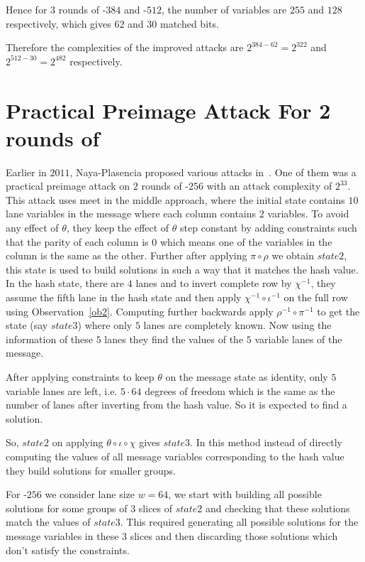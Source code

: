         Hence for $3$ rounds of \KECCAK-$384$ and \KECCAK-$512$, the number of variables are $255$ and $128$ respectively, which gives $62$ and $30$ matched bits.
        
        Therefore the complexities of the improved attacks are $2^{384 - 62} = 2^{322}$ and $2^{512 - 30} = 2^{482}$ respectively.

\section{Practical Preimage Attack For 2 rounds of }

Earlier in $2011$, Naya-Plasencia \etal proposed various attacks in~\cite{naya2011practical}. One of them was a practical preimage attack on $2$ rounds of \KECCAK-$256$ with an attack complexity of $2^{33}$. This attack uses meet in the middle approach, where the initial state contains $10$ lane variables in the message where each column contains $2$ variables. To avoid any effect of $\theta$, they keep the effect of $\theta$ step constant by adding constraints such that the parity of each column is $0$ which means one of the variables in the column is the same as the other. Further after applying $\pi \circ \rho$ we obtain $state2$, this state is used to build solutions in such a way that it matches the hash value. In the hash state, there are $4$ lanes and to invert complete row by $\chi^{-1}$, they assume the fifth lane in the hash state and then apply $\chi^{-1} \circ \iota^{-1}$ on the full row using Observation~\ref{ob2}. Computing further backwards apply $\rho^{-1} \circ \pi^{-1}$ to get the state (say $state3$) where only $5$ lanes are completely known. Now using the information of these $5$ lanes they find the values of the $5$ variable lanes of the message.

After applying constraints to keep $\theta$ on the message state as identity,  only $5$ variable lanes are left, i.e. $5 \cdot 64$ degrees of freedom which is the same as the number of lanes after inverting from the hash value. So it is expected to find a solution.

So, $state2$ on applying $\theta \circ \iota \circ \chi$ gives $state3$. In this method instead of directly computing the values of all message variables corresponding to the hash value they build solutions for smaller groups. 

For \KECCAK-$256$ we consider lane size $w = 64$, we start with building all possible solutions for some groups of $3$ slices of $state2$ and checking that these solutions match the values of $state3$. This required generating all possible solutions for the message variables in these $3$ slices and then discarding those solutions which don't satisfy the constraints.

